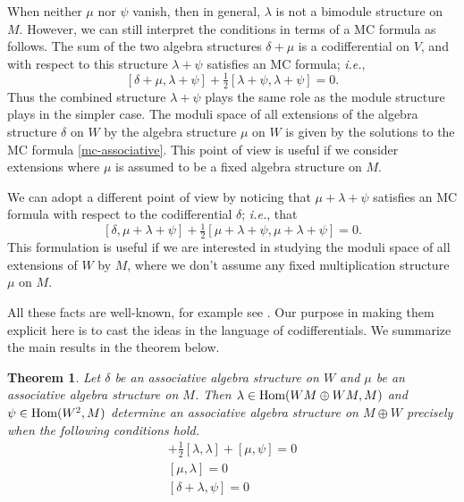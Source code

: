 \documentclass[12pt]{amsart}
\newtheorem{thm}{Theorem}[section]
\theoremstyle{definition}
\begin{document}
When neither $\mu$ nor $\psi$ vanish, then in general, $\lambda$
is not a bimodule structure on $M$. However, we can still interpret the
conditions in terms of a MC
formula as follows. The sum of the two algebra
structures $\delta+\mu$ is a codifferential on $V$,
and with respect to this structure $\lambda+\psi$ satisfies an
MC formula; {\hbox{\it i.e.}},
\begin{equation}\label{mc-associative}
[\delta+\mu,\lambda+\psi]+\tfrac12[\lambda+\psi,\lambda+\psi]=0.
\end{equation}
Thus the combined structure $\lambda+\psi$ plays the same role
as the module structure plays in the simpler case.  The moduli space
of all extensions  of the algebra structure $\delta$ on $W$ by the
algebra  structure $\mu$ on  $W$ is given by the solutions to the MC
formula \eqref{mc-associative}. This point of view is useful if we
consider extensions where $\mu$ is assumed to be a fixed algebra
structure on $M$.

We can adopt a different point of view by noticing that
$\mu+\lambda+\psi$ satisfies an MC formula with respect to the
codifferential $\delta$; {\hbox{\it i.e.}}, that
\begin{equation}\label{mc-second}
[\delta,\mu+\lambda+\psi]+\tfrac12[\mu+\lambda+\psi,\mu+\lambda+\psi]=0.
\end{equation}
This formulation is useful if we are interested in studying the
moduli space of all extensions of $W$ by $M$, where we don't assume
any fixed multiplication structure $\mu$ on $M$.

All these facts are well-known, for example see
\cite{gers,gers1,gers2,gers3,gers4,mac}. Our purpose in making them
explicit here is to cast the ideas in the language of codifferentials.
We summarize the main results in the theorem below.
\begin{thm} Let $\delta$ be an associative algebra structure
on $W$ and $\mu$ be an associative algebra structure on $M$.
Then $\lambda\in{\mbox{\rm Hom}}(WM\oplus WM,M)$
 and $\psi\in{\mbox{\rm Hom}}(W^2,M)$ determine an associative algebra structure
on $M\oplus W$ precisely when the following conditions hold.
\begin{align}
[\delta,\lambda]+\tfrac12[\lambda,\lambda]+[\mu,\psi]=0\\
[\mu,\lambda]=0\\
[\delta+\lambda,\psi]=0
\end{align}
\end{thm}
\end{document}
